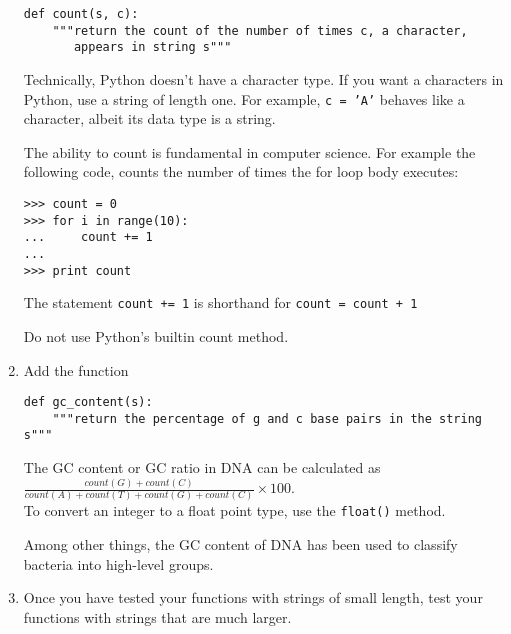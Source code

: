 \documentclass[12pt]{article}
\begin{document}
\begin{enumerate}[resume]
\begin{verbatim}
def count(s, c):
    """return the count of the number of times c, a character,
       appears in string s"""
\end{verbatim}

Technically, Python doesn't have a character type. If you want a characters in Python, use a string of length one. For example, \texttt{c = 'A'} behaves like a character, albeit its data type is a string.

The ability to count is fundamental in computer science. For example the following code, counts the number of times the for loop body executes:

\begin{verbatim}
>>> count = 0    
>>> for i in range(10):
...     count += 1
...
>>> print count
\end{verbatim}

The statement \texttt{count += 1} is shorthand for \texttt{count = count + 1}

Do not use Python's builtin count method.


\item Add the function

\begin{verbatim}
def gc_content(s):
    """return the percentage of g and c base pairs in the string s"""
\end{verbatim}

The GC content or GC ratio in DNA can be calculated as 
\vspace{12pt}
\\$\frac{count(G) + count(C)}{count(A) + count(T) + count(G) + count(C)} \times 100$.
\vspace{12pt}
\\To convert an integer to a float point type, use the \texttt{float()} method.

Among other things, the GC content of DNA has been used to classify bacteria into high-level groups.


\item Once you have tested your functions with strings of small length, test your functions with strings that are much larger.  


\end{enumerate}

\end{document}
